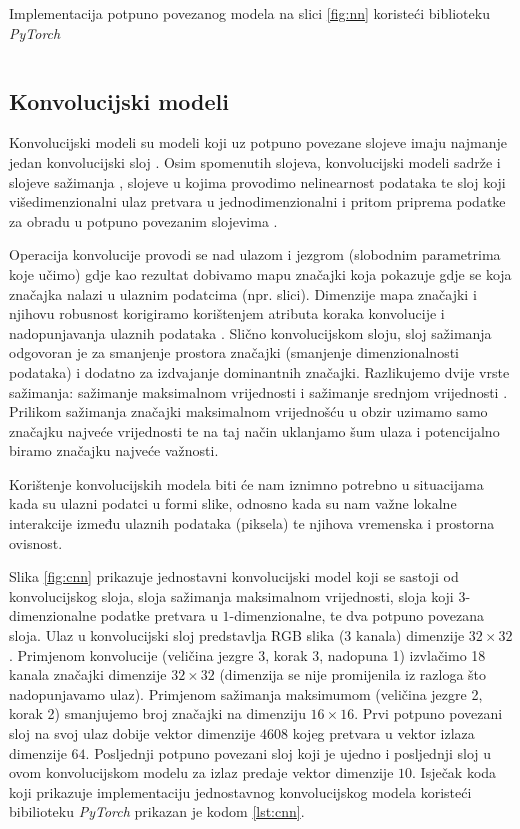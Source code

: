 \begin{listing}[H]
    \caption{Implementacija potpuno povezanog modela na slici \ref{fig:nn} koristeći biblioteku \textit{PyTorch}}
    \inputminted{python}{snippets/fcn.py}
    \label{lst:fcn}
\end{listing}

\subsection{Konvolucijski modeli}

Konvolucijski modeli  su modeli koji uz potpuno povezane slojeve imaju najmanje jedan konvolucijski sloj . Osim spomenutih slojeva, konvolucijski modeli sadrže i slojeve sažimanja , slojeve u kojima provodimo nelinearnost podataka te sloj koji višedimenzionalni ulaz pretvara u jednodimenzionalni i pritom priprema podatke za obradu u potpuno povezanim slojevima .

Operacija konvolucije provodi se nad ulazom i jezgrom  (slobodnim parametrima koje učimo) gdje kao rezultat dobivamo mapu značajki koja pokazuje gdje se koja značajka nalazi u ulaznim podatcima (npr. slici). Dimenzije mapa značajki i njihovu robusnost korigiramo korištenjem atributa koraka konvolucije  i nadopunjavanja ulaznih podataka . Slično konvolucijskom sloju, sloj sažimanja odgovoran je za smanjenje prostora značajki (smanjenje dimenzionalnosti podataka) i dodatno za izdvajanje dominantnih značajki. Razlikujemo dvije vrste sažimanja: sažimanje maksimalnom vrijednosti  i sažimanje srednjom vrijednosti . Prilikom sažimanja značajki maksimalnom vrijednošću u obzir uzimamo samo značajku najveće vrijednosti te na taj način uklanjamo šum ulaza i potencijalno biramo značajku najveće važnosti.

Korištenje konvolucijskih modela biti će nam iznimno potrebno u situacijama kada su ulazni podatci u formi slike, odnosno kada su nam važne lokalne interakcije između ulaznih podataka (piksela) te njihova vremenska i prostorna ovisnost.

Slika \ref{fig:cnn} \cite{NNsvg} prikazuje jednostavni konvolucijski model koji se sastoji od konvolucijskog sloja, sloja sažimanja maksimalnom vrijednosti, sloja koji $3$-dimenzionalne podatke pretvara u $1$-dimenzionalne, te dva potpuno povezana sloja. Ulaz u konvolucijski sloj predstavlja RGB slika (3 kanala) dimenzije $32 \times 32$. Primjenom konvolucije (veličina jezgre 3, korak 3, nadopuna 1) izvlačimo 18 kanala značajki dimenzije $32 \times 32$ (dimenzija se nije promijenila iz razloga što nadopunjavamo ulaz). Primjenom sažimanja maksimumom (veličina jezgre 2, korak 2) smanjujemo broj značajki na dimenziju $16 \times 16$. Prvi potpuno povezani sloj na svoj ulaz dobije vektor dimenzije $4608$ kojeg pretvara u vektor izlaza dimenzije $64$. Posljednji potpuno povezani sloj koji je ujedno i posljednji sloj u ovom konvolucijskom modelu za izlaz predaje vektor dimenzije $10$. Isječak koda koji prikazuje implementaciju jednostavnog konvolucijskog modela koristeći bibilioteku \textit{PyTorch} prikazan je kodom \ref{lst:cnn}.

